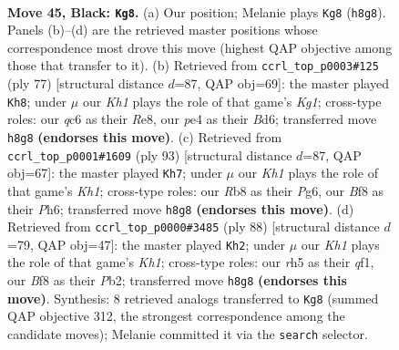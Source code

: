 \documentclass[11pt]{article}
\begin{document}
\clearpage

\begin{figure}[p]\centering
\begin{subfigure}{0.46\textwidth}\centering
\resizebox{\linewidth}{!}{%
\newchessgame
\chessboard[
  setfen={1r3b1k/1r3p2/2Q5/1n2p2R/R3P3/3K4/3N2N1/6q1 b - - 1 45},
  showmover=false,
  pgfstyle=straightmove, color=movearrow, markmove={h8-g8}
]}
\caption{}
\end{subfigure}\hfill
\begin{subfigure}{0.46\textwidth}\centering
\resizebox{\linewidth}{!}{%
\newchessgame
\chessboard[
  setfen={2r1r1k1/8/3b4/6Q1/4p3/4P2P/3q2P1/5RK1 b - - 6 39},
  showmover=false,
  pgfstyle=straightmove, color=movearrow, markmove={g8-h8}
]}
\caption{}
\end{subfigure}
\\[4pt]
\begin{subfigure}{0.46\textwidth}\centering
\resizebox{\linewidth}{!}{%
\newchessgame
\chessboard[
  setfen={1r5k/8/6pp/4Q3/p7/P7/1p4PP/2r2R1K b - - 19 47},
  showmover=false,
  pgfstyle=straightmove, color=movearrow, markmove={h8-h7}
]}
\caption{}
\end{subfigure}\hfill
\begin{subfigure}{0.46\textwidth}\centering
\resizebox{\linewidth}{!}{%
\newchessgame
\chessboard[
  setfen={4Qnk1/5pp1/7p/6r1/8/7P/1P1BR1P1/5q1K w - - 16 45},
  showmover=false,
  pgfstyle=straightmove, color=movearrow, markmove={h1-h2}
]}
\caption{}
\end{subfigure}
\caption{\textbf{Move 45, Black: \texttt{Kg8}.} (a) Our position; Melanie plays \texttt{Kg8} (\texttt{h8g8}). Panels (b)--(d) are the retrieved master positions whose correspondence most drove this move (highest QAP objective among those that transfer to it). (b) Retrieved from \texttt{ccrl\_top\_p0003\#125} (ply 77) [structural distance $d$=87, QAP obj=69]: the master played \texttt{Kh8}; under $\mu$ our \emph{Kh1} plays the role of that game's \emph{Kg1}; cross-type roles: our \emph{q}c6 as their \emph{R}e8, our \emph{p}e4 as their \emph{B}d6; transferred move \texttt{h8g8} \textbf{(endorses this move)}. (c) Retrieved from \texttt{ccrl\_top\_p0001\#1609} (ply 93) [structural distance $d$=87, QAP obj=67]: the master played \texttt{Kh7}; under $\mu$ our \emph{Kh1} plays the role of that game's \emph{Kh1}; cross-type roles: our \emph{R}b8 as their \emph{P}g6, our \emph{B}f8 as their \emph{P}h6; transferred move \texttt{h8g8} \textbf{(endorses this move)}. (d) Retrieved from \texttt{ccrl\_top\_p0000\#3485} (ply 88) [structural distance $d$=79, QAP obj=47]: the master played \texttt{Kh2}; under $\mu$ our \emph{Kh1} plays the role of that game's \emph{Kh1}; cross-type roles: our \emph{r}h5 as their \emph{q}f1, our \emph{B}f8 as their \emph{P}b2; transferred move \texttt{h8g8} \textbf{(endorses this move)}. Synthesis: 8 retrieved analogs transferred to \texttt{Kg8} (summed QAP objective 312, the strongest correspondence among the candidate moves); Melanie committed it via the \texttt{search} selector.}
\label{fig:thought-m89}
\end{figure}
\end{document}
